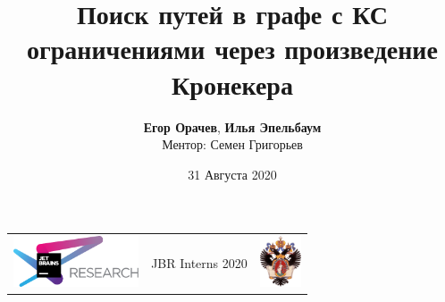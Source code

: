 \documentclass[xcolor=table,english]{beamer}
\title[Kronecker Product CFPQ]{Поиск путей в графе с КС ограничениями через произведение Кронекера}
\institute[СПбГУ]{
JetBrains Research, Лаборатория языковых инструментов  \\
Санкт-Петербургский Государственный университет
}
\author[Егор Орачев, Илья Эпельбаум]{\textbf{Егор Орачев}, \textbf{Илья Эпельбаум} \\ Ментор: Семен Григорьев}
\date{31 Августа 2020}
\begin{document}
{
\begin{frame}[fragile]
  \begin{table}
  \centering
  \begin{tabularx}{\linewidth}{YcX}
    \includegraphics[height=1.5cm]{pictures/jetbrainsResearch.pdf} \hfill
    & \begin{minipage}[t]{0.3\textwidth}\center \vspace{-1cm}  JBR Interns 2020
      \end{minipage}
    & \hfill \includegraphics[height=1.5cm]{pictures/SPbGU_Logo.png}
  \end{tabularx}
  \end{table}
  \titlepage
\end{frame}
}
\end{document}
